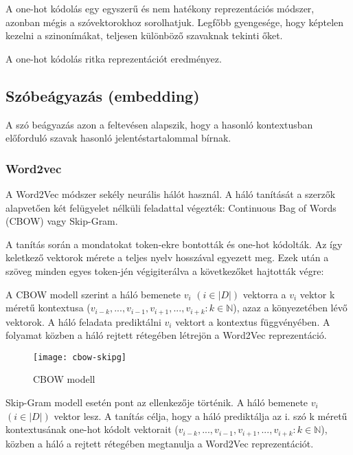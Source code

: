 A one-hot kódolás egy egyszerű és nem hatékony reprezentációs módszer, azonban mégis a szóvektorokhoz sorolhatjuk. Legfőbb gyengesége, hogy képtelen kezelni a szinonímákat, teljesen különböző szavaknak tekinti őket.

\begin{note}
	A one-hot kódolás ritka reprezentációt eredményez.
\end{note}

\subsection{Szóbeágyazás (embedding)}

A szó beágyazás azon a feltevésen alapszik, hogy a hasonló kontextusban előforduló szavak hasonló jelentéstartalommal bírnak.

\subsubsection{Word2vec}
A Word2Vec módszer sekély neurális hálót használ. A háló tanítását a szerzők alapvetően két felügyelet nélküli feladattal végezték: Continuous Bag of Words (CBOW) vagy Skip-Gram.

A tanítás során a mondatokat token-ekre bontották és one-hot kódolták. Az így keletkező vektorok mérete a teljes nyelv hosszával egyezett meg. Ezek után a szöveg minden egyes token-jén végigiterálva a következőket hajtották végre:

A CBOW modell szerint a háló bemenete $v_i$
$\left( i \in \left|D\right| \right)$ vektorra a $v_i$ vektor k méretű kontextusa ($v_{i-k},...,v_{i-1}, v_{i+1},..., v_{i+k} : k \in \mathbb{N}$), azaz a könyezetében lévő vektorok. A háló feladata prediktálni $v_i$ vektort a kontextus függvényében. A folyamat közben a háló rejtett rétegében létrejön a Word2Vec reprezentáció.

\begin{figure}[H]
	\centering
	\texttt{[image: cbow-skipg]}
	\caption{CBOW modell}
\end{figure}

Skip-Gram modell esetén pont az ellenkezője történik. A háló bemenete $v_i$
$\left( i \in \left|D\right| \right)$ vektor lesz. A tanítás célja, hogy a háló prediktálja az i. szó k méretű kontextusának one-hot kódolt vektorait ($v_{i-k},...,v_{i-1}, v_{i+1},..., v_{i+k} : k \in \mathbb{N}$), közben a háló a rejtett rétegében megtanulja a Word2Vec reprezentációt.

